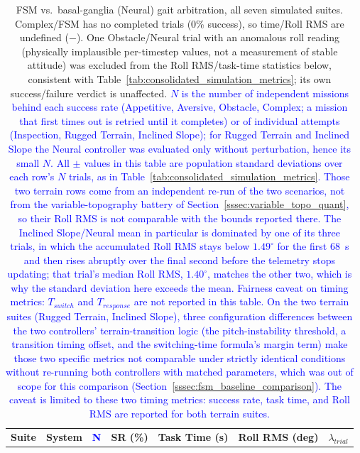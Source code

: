 \documentclass[preprint,12pt]{elsarticle}
\newcommand{\revblue}[1]{\textcolor{blue}{#1}}
\begin{document}
\begin{table}[htbp]
\centering
\caption{FSM vs.\ basal-ganglia (Neural) gait arbitration, all seven simulated suites. Complex/FSM has no completed trials (0\% success), so time/Roll RMS are undefined ($-$). One Obstacle/Neural trial with an anomalous roll reading (physically implausible per-timestep values, not a measurement of stable attitude) was excluded from the Roll RMS/task-time statistics below, consistent with Table~\ref{tab:consolidated_simulation_metrics}; its own success/failure verdict is unaffected. \revblue{$N$ is the number of independent missions behind each success rate (Appetitive, Aversive, Obstacle, Complex; a mission that first times out is retried until it completes) or of individual attempts (Inspection, Rugged Terrain, Inclined Slope); for Rugged Terrain and Inclined Slope the Neural controller was evaluated only without perturbation, hence its small $N$. All $\pm$ values in this table are population standard deviations over each row's $N$ trials, as in Table~\ref{tab:consolidated_simulation_metrics}. Those two terrain rows come from an independent re-run of the two scenarios, not from the variable-topography battery of Section~\ref{sssec:variable_topo_quant}, so their Roll RMS is not comparable with the bounds reported there. The Inclined Slope/Neural mean in particular is dominated by one of its three trials, in which the accumulated Roll RMS stays below $1.49^\circ$ for the first $68$~s and then rises abruptly over the final second before the telemetry stops updating; that trial's median Roll RMS, $1.40^\circ$, matches the other two, which is why the standard deviation here exceeds the mean.} \revblue{Fairness caveat on timing metrics: $T_{switch}$ and $T_{response}$ are not reported in this table. On the two terrain suites (Rugged Terrain, Inclined Slope), three configuration differences between the two controllers' terrain-transition logic (the pitch-instability threshold, a transition timing offset, and the switching-time formula's margin term) make those two specific metrics not comparable under strictly identical conditions without re-running both controllers with matched parameters, which was out of scope for this comparison (Section~\ref{sssec:fsm_baseline_comparison}). The caveat is limited to these two timing metrics: success rate, task time, and Roll RMS are reported for both terrain suites.}}
\label{tab:fsm_comparison}
\small
\setlength{\tabcolsep}{4pt}
\begin{tabular}{l l c c c c c}
\toprule
\textbf{Suite} & \textbf{System} & \revblue{\textbf{N}} & \textbf{SR (\%)} & \textbf{Task Time (s)} & \textbf{Roll RMS (deg)} & \textbf{$\lambda_{trial}$} \\

\end{tabular}
\end{table}
\end{document}
